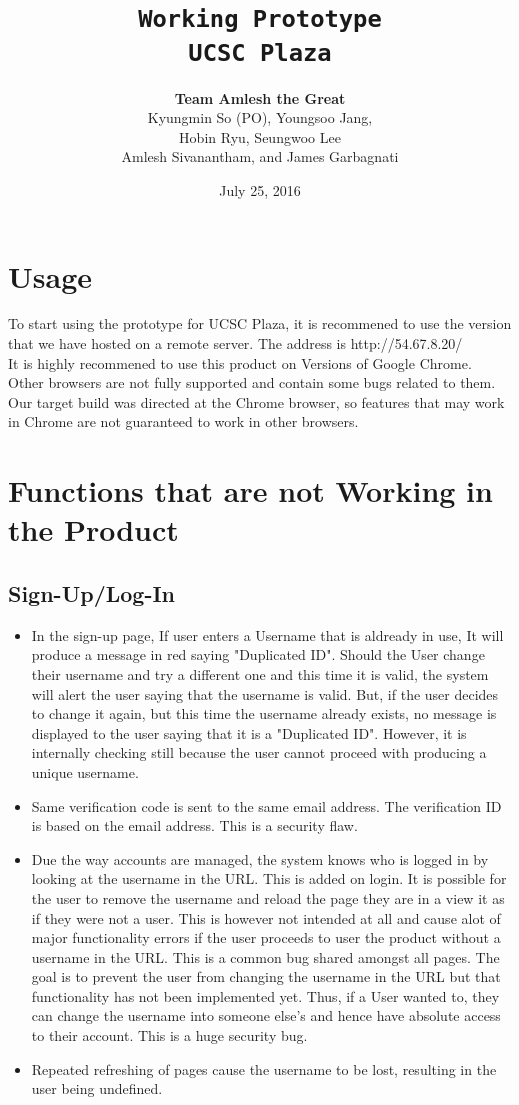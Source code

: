 \documentclass[10pt]{article}
\title{\color{primary}\texttt{Working Prototype \\ UCSC Plaza}}
\author{{\color{secondary}\textbf{Team Amlesh the Great}} \\ Kyungmin So (PO), Youngsoo Jang, \\ Hobin Ryu, Seungwoo Lee \\ Amlesh Sivanantham, and James Garbagnati }
\date{July 25, 2016}
\newcommand{\fancysec}[2] {{\color{primary}\section{#1} \label{sec:#2}}}
\newcommand{\fancysub}[2] {{\color{primary}\subsection{#1} \label{sec:#2}}}
\begin{document}
	
	\maketitle
	\fancysec{Usage}{usage}
		To start using the prototype for UCSC Plaza, it is recommened to use the version that we have hosted on a remote server. The address is http://54.67.8.20/ \\ It is highly recommened to use this product on Versions of Google Chrome. Other browsers are not fully supported and contain some bugs related to them. Our target build was directed at the Chrome browser, so features that may work in Chrome are not guaranteed to work in other browsers.
	\fancysec{Functions that are not Working in the Product}{notworking}
		\fancysub{Sign-Up/Log-In}{signup/login}
			\begin{itemize}
				\item In the sign-up page, If user enters a Username that is aldready in use, It will produce a message in red saying "Duplicated ID". Should the User change their username and try a different one and this time it is valid, the system will alert the user saying that the username is valid. But, if the user decides to change it again, but this time the username already exists, no message is displayed to the user saying that it is a "Duplicated ID". However, it is internally checking still because the user cannot proceed with producing a unique username.
				\item Same verification code is sent to the same email address. The verification ID is based on the email address. This is a security flaw.
				\item Due the way accounts are managed, the system knows who is logged in by looking at the username in the URL. This is added on login. It is possible for the user to remove the username and reload the page they are in a view it as if they were not a user. This is however not intended at all and cause alot of major functionality errors if the user proceeds to user the product without a username in the URL. This is a common bug shared amongst all pages. The goal is to prevent the user from changing the username in the URL but that functionality has not been implemented yet. Thus, if a User wanted to, they can change the username into someone else's and hence have absolute access to their account. This is a huge security bug.
				\item Repeated refreshing of pages cause the username to be lost, resulting in the user being undefined.
			\end{itemize}
\end{document}
